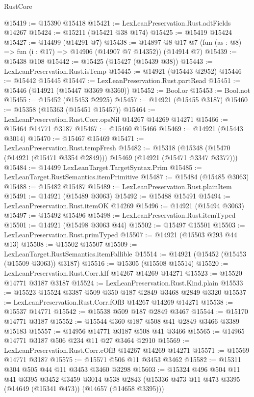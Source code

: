 \begin{lexlean}{RustCore}
\begin{coremodule}
@15419 := @15390 @15418
@15421 := LexLeanPreservation.Rust.adtFields @14267
@15424 := @15211 (@15421 @38 @174)
@15425 := @15419 @15424
@15427 := @14499 (@14291 @7)
@15438 := @14897 @8 @17 @7 (fun (as : @8) => fun (i : @17) => @14906 (@14907 @7 @14352)) (@14914 @7)
@15439 := @15438 @108
@15442 := @15425 (@15427 (@15439 @38))
@15443 := LexLeanPreservation.Rust.isTemp
@15445 := @14921 (@15443 @2952)
@15446 := @15442 @15445
@15447 := LexLeanPreservation.Rust.partRead
@15451 := @15446 (@14921 (@15447 @3369 @3360))
@15452 := Bool.or
@15453 := Bool.not
@15455 := @15452 (@15453 @2925)
@15457 := @14921 (@15455 @3187)
@15460 := @15358 (@15363 (@15451 @15457))
@15464 := LexLeanPreservation.Rust.Corr.opsNil @14267 @14269 @14271
@15466 := @15464 @14771 @3187
@15467 := @15460 @15466
@15469 := @14921 (@15443 @3014)
@15470 := @15467 @15469
@15471 := LexLeanPreservation.Rust.tempFresh
@15482 := @15318
    (@15348 (@15470 (@14921 (@15471 @3354 @2849))) @15469 (@14921 (@15471 @3347 @3377)))
@15484 := @14499 LexLeanTarget.TargetSyntax.Prim
@15485 := LexLeanTarget.RustSemantics.itemPrimitive
@15487 := @15484 (@15485 @3063)
@15488 := @15482 @15487
@15489 := LexLeanPreservation.Rust.plainItem
@15491 := @14921 (@15489 @3063)
@15492 := @15488 @15491
@15494 := LexLeanPreservation.Rust.itemOK @14269
@15496 := @14921 (@15494 @3063)
@15497 := @15492 @15496
@15498 := LexLeanPreservation.Rust.itemTyped
@15501 := @14921 (@15498 @3063 @44)
@15502 := @15497 @15501
@15503 := LexLeanPreservation.Rust.primTyped
@15507 := @14921 (@15503 @293 @44 @13)
@15508 := @15502 @15507
@15509 := LexLeanTarget.RustSemantics.itemFallible
@15514 := @14921 (@15452 (@15453 (@15509 @3063)) @3187)
@15516 := @15305 (@15508 @15514)
@15520 := LexLeanPreservation.Rust.Corr.kIf @14267 @14269 @14271
@15523 := @15520 @14771 @3187 @3187
@15524 := LexLeanPreservation.Rust.Kind.plain
@15533 := @15523 @15524 @3387 @509 @350 @187 @2849 @3468 @2849 @3320
@15537 := LexLeanPreservation.Rust.Corr.fOfB @14267 @14269 @14271
@15538 := @15537 @14771
@15542 := @15538 @509 @187 @2849 @3467
@15544 := @15170 @14771 @3187
@15552 := @15544 @360 @187 @508 @41 @2849 @3466 @3389 @15183
@15557 := @14956 @14771 @3187 @508 @41 @3466
@15565 := @14965 @14771 @3187 @506 @234 @11 @27 @3464 @2910
@15569 := LexLeanPreservation.Rust.Corr.eOfB @14267 @14269 @14271
@15571 := @15569 @14771 @3187
@15575 := @15571 @506 @11 @3453 @3462
@15582 := @15311 @304 @505 @44 @11 @3453 @3460 @3298
@15603 := @15324
    @496
    @504
    @11
    @41
    @3395
    @3452
    @3459
    @3014
    @538
    @2843
    (@15336 @473 @11 @473 @3395 (@14649 (@15341 @473)) (@14657 (@14658 @3395)))

\end{coremodule}
\end{lexlean}
